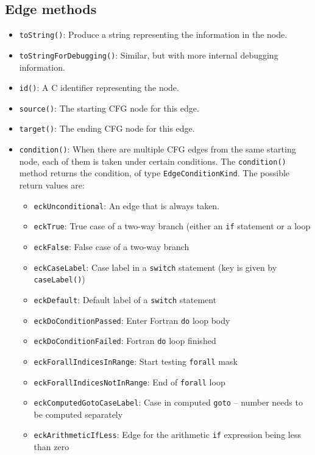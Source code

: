 \subsection{Edge methods}

\begin{itemize}
\item \lstinline{toString()}: Produce a string representing the information
      in the node.
\item \lstinline{toStringForDebugging()}: Similar, but with more internal
      debugging information.
\item \lstinline{id()}: A C identifier representing the node.
\item \lstinline{source()}: The starting CFG node for this edge.
\item \lstinline{target()}: The ending CFG node for this edge.
\item \lstinline{condition()}: When there are multiple CFG edges from the
      same starting node, each of them is taken under certain conditions.  The
\lstinline{condition()} method returns the condition, of type
\lstinline{EdgeConditionKind}.  The possible return values are:
  \begin{itemize}
  \item \lstinline{eckUnconditional}: An edge that is always taken.
  \item \lstinline{eckTrue}: True case of a two-way branch (either an
                             \lstinline{if} statement or a loop
  \item \lstinline{eckFalse}: False case of a two-way branch
  \item \lstinline{eckCaseLabel}: Case label in a \lstinline{switch} statement (key is given by \lstinline{caseLabel()})
  \item \lstinline{eckDefault}: Default label of a \lstinline{switch} statement
  \item \lstinline{eckDoConditionPassed}: Enter Fortran \lstinline{do} loop body
  \item \lstinline{eckDoConditionFailed}: Fortran \lstinline{do} loop finished
  \item \lstinline{eckForallIndicesInRange}: Start testing \lstinline{forall} mask
  \item \lstinline{eckForallIndicesNotInRange}: End of \lstinline{forall} loop
  \item \lstinline{eckComputedGotoCaseLabel}: Case in computed \lstinline{goto} -- number needs to be computed separately
  \item \lstinline{eckArithmeticIfLess}: Edge for the arithmetic \lstinline{if} expression being less than zero

\end{itemize}
\end{itemize}
